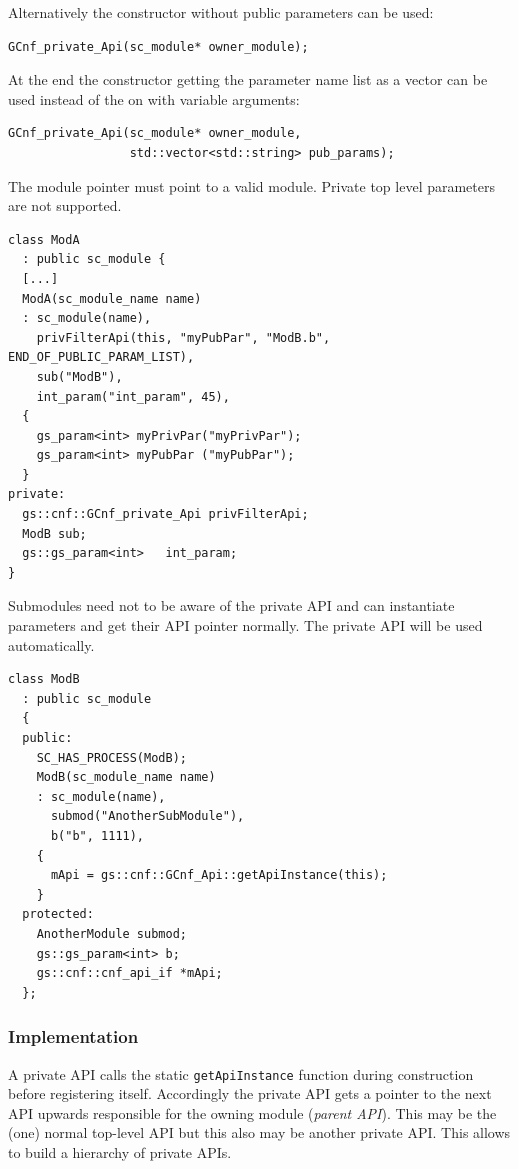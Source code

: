 Alternatively the constructor without public parameters can be used:
\begin{lstlisting}
GCnf_private_Api(sc_module* owner_module);
\end{lstlisting}

At the end the constructor getting the parameter name list as a vector can be used instead of the on with variable arguments:
\begin{lstlisting}
GCnf_private_Api(sc_module* owner_module,
                 std::vector<std::string> pub_params);
\end{lstlisting}

The module pointer must point to a valid module. Private top level parameters are not supported.


\begin{lstlisting}
class ModA
  : public sc_module {
  [...]
  ModA(sc_module_name name)
  : sc_module(name),
    privFilterApi(this, "myPubPar", "ModB.b", END_OF_PUBLIC_PARAM_LIST),
    sub("ModB"),
    int_param("int_param", 45),
  {
    gs_param<int> myPrivPar("myPrivPar");
    gs_param<int> myPubPar ("myPubPar");
  }
private:
  gs::cnf::GCnf_private_Api privFilterApi;
  ModB sub;
  gs::gs_param<int>   int_param;
}
\end{lstlisting}

\noindent
\begin{minipage}{\textwidth}
Submodules need not to be aware of the private API and can instantiate parameters and get their API pointer normally. The private API will be used automatically.

\begin{lstlisting}
class ModB
  : public sc_module
  {
  public:
    SC_HAS_PROCESS(ModB);
    ModB(sc_module_name name)
    : sc_module(name),
      submod("AnotherSubModule"),
      b("b", 1111),
    {
      mApi = gs::cnf::GCnf_Api::getApiInstance(this);
    }
  protected:
    AnotherModule submod;
    gs::gs_param<int> b;
    gs::cnf::cnf_api_if *mApi;
  };
\end{lstlisting}
\end{minipage}

\subsubsection{Implementation}
A private API calls the static \lstinline|getApiInstance| function during construction before registering itself. Accordingly the private API gets a pointer to the next API upwards responsible for the owning module ({\em parent API}). This may be the (one) normal top-level API but this also may be another private API. This allows to build a hierarchy of private APIs.

